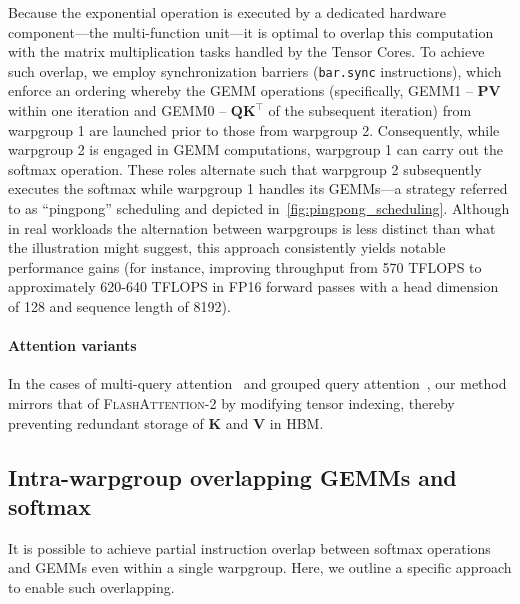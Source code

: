 Because the exponential operation is executed by a dedicated hardware component—the multi-function unit—it is optimal to overlap this computation with the matrix multiplication tasks handled by the Tensor Cores. To achieve such overlap, we employ synchronization barriers (\texttt{bar.sync} instructions), which enforce an ordering whereby the GEMM operations (specifically, GEMM1 -- $\mathbf{P} \mathbf{V}$ within one iteration and GEMM0 -- $\mathbf{Q} \mathbf{K}^\top$ of the subsequent iteration) from warpgroup 1 are launched prior to those from warpgroup 2. Consequently, while warpgroup 2 is engaged in GEMM computations, warpgroup 1 can carry out the softmax operation. These roles alternate such that warpgroup 2 subsequently executes the softmax while warpgroup 1 handles its GEMMs—a strategy referred to as ``pingpong'' scheduling and depicted in~\cref{fig:pingpong_scheduling}. Although in real workloads the alternation between warpgroups is less distinct than what the illustration might suggest, this approach consistently yields notable performance gains (for instance, improving throughput from 570 TFLOPS to approximately 620-640 TFLOPS in FP16 forward passes with a head dimension of 128 and sequence length of 8192).

\paragraph{Attention variants} In the cases of multi-query attention~\citep{shazeer2019fast} and grouped query attention~\citep{ainslie2023gqa}, our method mirrors that of \textsc{FlashAttention-2} by modifying tensor indexing, thereby preventing redundant storage of $\mathbf{K}$ and $\mathbf{V}$ in HBM.

\subsection{Intra-warpgroup overlapping GEMMs and softmax}

It is possible to achieve partial instruction overlap between softmax operations and GEMMs even within a single warpgroup. Here, we outline a specific approach to enable such overlapping.

